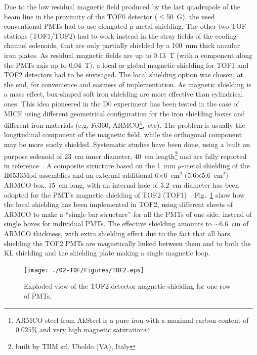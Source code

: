 Due to the low residual magnetic field produced by the last quadrupole
of the beam line in the proximity of the TOF0 detector ($\leq$50~G),
the used conventional PMTs had to use elongated $\mu$-metal shielding.
The other two TOF stations (TOF1/TOF2) had to work instead in the
stray fields of the cooling channel solenoids, that are only partially
shielded by a 100~mm thick annular iron plates. As residual magnetic
fields are up to 0.13~T (with a component along the PMTs axis up to
0.04~T), a local or global magnetic shielding for TOF1 and TOF2
detectors had to be envisaged.  The local shielding option was chosen,
at the end, for convenience and easiness of implementation.  As
magnetic shielding is a mass effect, box-shaped soft iron shielding
are more effective than cylindrical ones. This idea pioneered in the
D0 experiment has been tested in the case of MICE using different
geometrical configuration for the iron shielding boxes and different
iron materials (e.g. Fe360, ARMCO\footnote{ARMCO steel from AkSteel is
  a pure iron with a maximal carbon content of $0.025\%$ and very high
  magnetic saturation},~etc).  The problem is usually the longitudinal
component of the magnetic field, while the orthogonal component may be
more easily shielded.  Systematic studies have been done, using a
built on purpose solenoid of 23~cm inner diameter, 40~cm
length\footnote{built by TBM srl, Uboldo (VA), Italy} and are fully
reported in reference~\cite{2012NIMPA.693..130B}.  A composite
structure based on the 1~mm $\mu$-metal shielding of the H6533Mod
assemblies and an external additional 6$\times$6~cm$^2$
(5.6$\times$5.6~cm$^2$) ARMCO box, 15~cm long, with an internal hole
of 3.2~cm diameter has been adopted for the PMT's magnetic shielding
of TOF2 (TOF1)~\cite{NOTE455}.  Fig.~\ref{fig:TOF1} show how the local
shielding has been implemented in TOF2, using different sheets of
ARMCO to make a ``single bar structure'' for all the PMTs of one side,
instead of single boxes for individual PMTs. The effective shielding
amounts to $\sim$6.6~cm of ARMCO thickness, with extra shielding
effect due to the fact that all bars shielding the TOF2 PMTs are
magnetically linked between them and to both the KL shielding and the
shielding plate making a single magnetic loop.
\begin{figure}
  \begin{center}
  \texttt{[image: ./02-TOF/Figures/TOF2.eps]} \\
  \caption{Exploded view of the TOF2 detector magnetic shielding for one row of PMTs.}
  \label{fig:TOF1}
  \end{center}
\end{figure}
